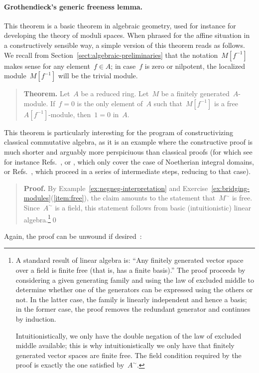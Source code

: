 \documentclass{ws-rv9x6}
\begin{document}
{\paragraph{Grothendieck's generic freeness lemma.} This theorem is a basic
theorem in algebraic geometry, used for instance for developing the theory of
moduli spaces. When phrased for the affine situation in a constructively
sensible way, a simple version of this theorem reads as follows. We recall
from Section~\ref{sect:algebraic-preliminaries} that
the notation~$M[f^{-1}]$ makes sense for any element~$f \in A$; in case~$f$ is
zero or nilpotent, the localized module~$M[f^{-1}]$ will be the trivial module.\par
\begin{quote}
\textbf{Theorem.}
Let~$A$ be a reduced ring. Let~$M$ be a finitely generated~$A$-module.
If~$f = 0$ is the only element of~$A$ such that~$M[f^{-1}]$ is a
free~$A[f^{-1}]$-module, then~$1 = 0$ in~$A$.
\end{quote}
This theorem is particularly interesting for the program of constructivizing
classical commutative algebra, as it is an example where the constructive proof
is much shorter and arguably more perspiciuous than classical proofs (for which
see for instance Refs.~\cite[Lemme~6.9.2]{ega-4-2},
\cite[Thm.~24.1]{matsumura:commutative-ring-theory} or
\cite[Thm.~14.4]{eisenbud:commutative-algebra}, which only cover the case of
Noetherian integral domains, or Refs.~,
\cite[Tag~051Q]{stacks-project}
which proceed in a series of intermediate steps, reducing to that case).\par
\begin{quote}
\textbf{Proof.} By Example~\ref{ex:negneg-interpretation} and
Exercise~\ref{ex:bridging-modules}(\ref{item:free}), the claim amounts to the statement that~$M^\sim$ is \notnot
free. Since~$A^\sim$ is a field, this statement follows from
basic (intuitionistic) linear algebra.\footnote{A standard result of linear
algebra is: ``Any finitely generated vector space over a field is finite free
(that is, has a finite basis).'' The proof proceeds by considering a given
generating family and using the law of excluded middle to determine whether one
of the generators can be expressed using the others or not. In the latter case,
the family is linearly independent and hence a basis; in the former case, the
proof removes the redundant generator and continues by induction.

Intuitionistically, we only have the double negation of the law of excluded
middle available; this is why intuitionistically we only have that finitely
generated vector spaces are \notnot finite free. The field condition required
by the proof is exactly the one satisfied by~$A^\sim$.}\qed\end{quote}
Again, the proof can be unwound if
desired~\cite[Proposition~3]{blechschmidt:generic-freeness}:

}
\end{document}
